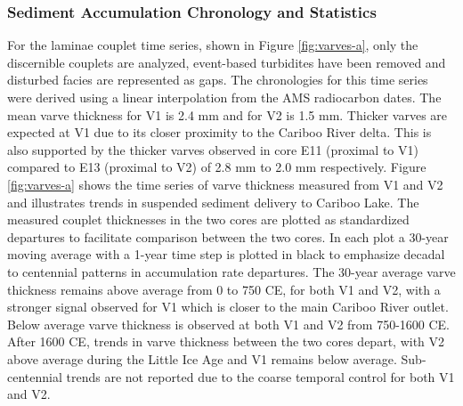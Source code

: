 \documentclass[Royal,times,doublespace,sageh]{sagej}
\begin{document}
\hypertarget{sediment-accumulation-chronology-and-statistics}{%
\subsubsection{Sediment Accumulation Chronology and
Statistics}\label{sediment-accumulation-chronology-and-statistics}}

For the laminae couplet time series, shown in Figure \ref{fig:varves-a},
only the discernible couplets are analyzed, event-based turbidites have
been removed and disturbed facies are represented as gaps. The
chronologies for this time series were derived using a linear
interpolation from the AMS radiocarbon dates. The mean varve thickness
for V1 is 2.4 mm and for V2 is 1.5 mm. Thicker varves are expected at V1
due to its closer proximity to the Cariboo River delta. This is also
supported by the thicker varves observed in core E11 (proximal to V1)
compared to E13 (proximal to V2) of 2.8 mm to 2.0 mm respectively.
Figure \ref{fig:varves-a} shows the time series of varve thickness
measured from V1 and V2 and illustrates trends in suspended sediment
delivery to Cariboo Lake. The measured couplet thicknesses in the two
cores are plotted as standardized departures to facilitate comparison
between the two cores. In each plot a 30-year moving average with a
1-year time step is plotted in black to emphasize decadal to centennial
patterns in accumulation rate departures. The 30-year average varve
thickness remains above average from 0 to 750 CE, for both V1 and V2,
with a stronger signal observed for V1 which is closer to the main
Cariboo River outlet. Below average varve thickness is observed at both
V1 and V2 from 750-1600 CE. After 1600 CE, trends in varve thickness
between the two cores depart, with V2 above average during the Little
Ice Age and V1 remains below average. Sub-centennial trends are not
reported due to the coarse temporal control for both V1 and V2.
\end{document}
